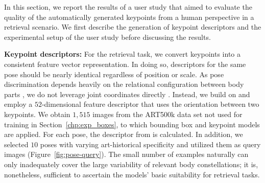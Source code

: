 \documentclass[sigconf]{acmart}
\begin{document}
In this section, we report the results of a user study that aimed to evaluate the quality of the automatically generated keypoints from a human perspective in a retrieval scenario. We first describe the generation of keypoint descriptors and the experimental setup of the user study before discussing the results.

\textbf{Keypoint descriptors:} For the retrieval task, we convert keypoints into a consistent feature vector representation. 
In doing so, descriptors for the same pose should be nearly identical regardless of position or scale. 
As pose discrimination depends heavily on the relational configuration between body parts \cite{DBLP:journals/tvcg/HoK09}, we do not leverage joint coordinates directly \cite{DBLP:journals/jvca/SoB05, DBLP:conf/humanoids/HaradaTMS04}. 
Instead, we build on \citet{DBLP:journals/tvcg/ChenZNYWX11}
and employ a $52$-dimensional feature descriptor that uses the orientation between two keypoints. 
We obtain $1,515$ images from the ART500k data set not used for training in Section~\ref{chp:exp_boxes}, to which bounding box and keypoint models are applied. 
For each pose, the descriptor from \citet{DBLP:journals/tvcg/ChenZNYWX11} is calculated. 
In addition, we selected $10$ poses with varying art-historical specificity and utilized them as query images (Figure~\ref{fig:pose-query}). 
The small number of examples naturally can only inadequately cover the large variability of relevant body constellations; it is, nonetheless, sufficient to ascertain the models' basic suitability for retrieval tasks.
\end{document}
